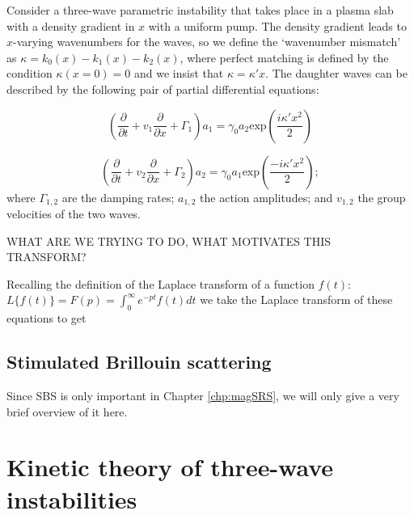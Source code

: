 Consider a three-wave parametric instability that takes place in a plasma slab with a density gradient in $x$ with a uniform pump. The density gradient leads to $x$-varying wavenumbers for the waves, so we define the `wavenumber mismatch' as $\kappa = k_0(x) - k_1(x) - k_2(x)$, where perfect matching is defined by the condition $\kappa(x=0) = 0$ and we insist that $\kappa = \kappa' x$. The daughter waves can be described by the following pair of partial differential equations:

\begin{equation}
 \left(\frac{\partial}{\partial t} + v_1\frac{\partial}{\partial x} + \Gamma_1 \right)a_1 = \gamma_0a_2\text{exp}\left(\frac{i\kappa'x^2}{2}\right)
\end{equation}

\begin{equation}
 \left(\frac{\partial}{\partial t} + v_2\frac{\partial}{\partial x} + \Gamma_2 \right)a_2 = \gamma_0a_1\text{exp}\left(\frac{-i\kappa'x^2}{2}\right);
\end{equation} 
where $\Gamma_{1,2}$ are the damping rates; $a_{1,2}$ the action amplitudes; and $v_{1,2}$ the group velocities of the two waves. 

WHAT ARE WE TRYING TO DO, WHAT MOTIVATES THIS TRANSFORM?

Recalling the definition of the Laplace transform of a function $f(t)$: $L\{f(t)\}= F(p) = \int_0^\infty e^{-pt} f(t) dt$ we take the Laplace transform of these equations to get






\subsection{Stimulated Brillouin scattering}
Since SBS is only important in Chapter \ref{chp:magSRS}, we will only give a very brief overview of it here.




\section{Kinetic theory of three-wave instabilities}\label{sec:kineticTheory}

